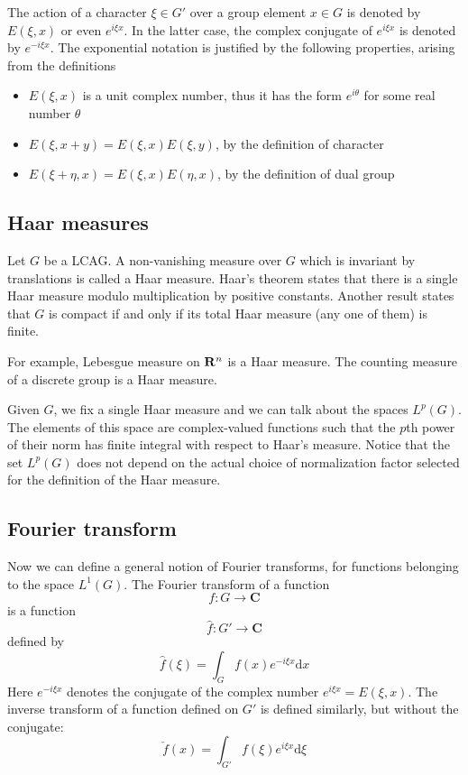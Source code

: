 The action of a character $\xi\in G'$ over a group element $x\in G$ is
denoted by $E(\xi,x)$ or even $e^{i\xi x}$.  In the latter case, the complex
conjugate of $e^{i\xi x}$ is denoted by $e^{-i\xi x}$.  The exponential
notation is justified by the following properties, arising from the
definitions

\begin{itemize}
	\item $E(\xi,x)$ is a unit complex number, thus it has the form
	$e^{i\theta}$ for some real number $\theta$
	\item $E(\xi,x+y) = E(\xi,x)E(\xi,y)$, by the definition of character
	\item $E(\xi + \eta,x) = E(\xi,x)E(\eta,x)$, by the definition of dual
	group
\end{itemize}

\subsection{Haar measures}

Let $G$ be a LCAG.  A non-vanishing measure over $G$ which is invariant by
translations is called a Haar measure.  Haar's theorem states that there is a
single Haar measure modulo multiplication by positive constants.  Another
result states that $G$ is compact if and only if its total Haar measure (any
one of them) is finite.

For example, Lebesgue measure on $\mathbf{R}^n$ is a Haar measure.  The
counting measure of a discrete group is a Haar measure.

Given $G$, we fix a single Haar measure and we can talk about the spaces
$L^p(G)$.  The elements of this space are complex-valued functions such that
the $p$th power of their norm has finite integral with respect to Haar's
measure.  Notice that the set $L^p(G)$ does not depend on the actual choice
of normalization factor selected for the definition of the Haar measure.

\subsection{Fourier transform}

Now we can define a general notion of Fourier transforms, for functions
belonging to the space $L^1(G)$.  The Fourier
transform of a function
\begin{equation}
f:G\to\mathbf{C}
\end{equation}
is a function
\begin{equation}
\hat f:G'\to\mathbf{C}
\end{equation}
defined by
\begin{equation}
\hat f(\xi) = \int_G f(x) e^{-i\xi x}\mathrm{d} x
\end{equation}
Here $e^{-i\xi x}$ denotes the conjugate of the complex number
$e^{i\xi x}=E(\xi,x)$.  The inverse transform of a function defined on $G'$ is defined similarly, but
without the conjugate:
\begin{equation}
\check f(x) = \int_{G'} f(\xi) e^{i\xi x}\mathrm{d} \xi
\end{equation}

